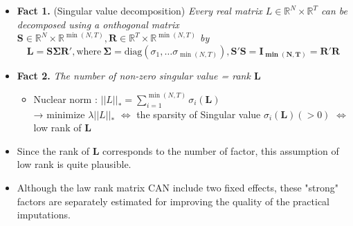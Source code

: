 \documentclass[xcolor=svgnames,aspectratio=169]{beamer}
\newcommand{\R}{\mathbb{R}}
\begin{document}
\begin{frame}
    \begin{itemize}
        \item \textbf{Fact 1.} (Singular value decomposition) \textit{Every real matrix $L\in\R^N\times \R^T$ can be decomposed using a onthogonal matrix $\mathbf{S}\in \R^N\times \R^{\min(N,T)},\mathbf{R}\in\R^T\times \R^{\min(N,T)}$ by}
        \[
        \mathbf{L}=\mathbf{S}\mathbf{\Sigma}\mathbf{R'}, \text{where} \ \mathbf{\Sigma}=\text{diag}(\sigma_1,\dots\sigma_{\min(N,T)}), \mathbf{S'S=I_{\min(N,T)}=R'R}
        \]
        \item \textbf{Fact 2.} \textit{The number of non-zero singular value = rank $\mathbf{L}$}
        \begin{itemize}
            \item Nuclear norm : $||L||_*=\sum_{i=1}^{\min(N,T)} \sigma_i(\mathbf{L})$ \\
            → minimize $\lambda||L||_*$ $\Leftrightarrow $ the sparsity of Singular value $\sigma_i(\mathbf{L})(>0)$ $\Leftrightarrow $ low rank of $\mathbf{L}$
        \end{itemize}
        \item Since the rank of $\mathbf{L}$ corresponds to \alert{the number of factor}, this assumption of low rank is quite plausible. 
        \item Although the law rank matrix CAN include two fixed effects, these "strong" factors are separately estimated for improving the quality of the practical imputations.
    \end{itemize}
\end{frame}
\end{document}
